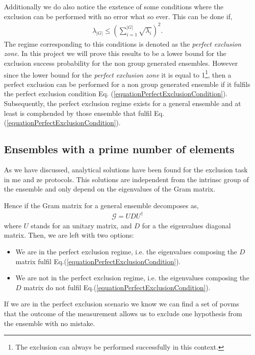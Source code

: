 \documentclass[12pt,letterpaper]{article}
\begin{document}
\begin{multicols}{2}
Additionally we do also notice the exstence of some conditions where the exclusion can be performed with no error what so ever. This can be done if,
\begin{align}\label{equationPerfectExclusionCondition}
	\lambda_{|G|}\leq \left(\sum_{i=1}^{|G|}\sqrt{\lambda_i}\right)^2.
\end{align}
The regime corresponding to this conditions is denoted as the \emph{perfect exclusion zone}. In this project we will prove this results to be a lower bound for the exclusion success probability for the non group generated ensembles. However since the lower bound for the \emph{perfect exclusion zone} it is equal to 1\footnote{The exclusion can always be performed successfully in this context.}, then a perfect exclusion can be performed for a non group generated ensemble if it fulfils the perfect exclusion condition Eq. (\ref{equationPerfectExclusionCondition}). Subsequently, the perfect exclusion regime exists for a general ensemble and at least is comphended by those ensemble that fulfil Eq. (\ref{equationPerfectExclusionCondition}).

\subsection{Ensembles with a prime number of elements}

As we have discussed, analytical solutions have been found for the exclusion task in \gls{me} and \gls{ze} protocols. This solutions are independent from the intrinsc group of the ensemble and only depend on the eigenvalues of the Gram matrix. 

Hence if the Gram matrix for a general ensemble decomposes as,
\begin{align}
	\mathcal{G}= UDU^\dagger
\end{align}
where $U$ stands for an unitary matrix, and $D$ for a the eigenvalues diagonal matrix. Then, we are left with two options:
\begin{itemize}
	\item We are in the perfect exclusion regime, i.e. the eigenvalues composing the $D$ matrix fulfil Eq.(\ref{equationPerfectExclusionCondition}).
	\item We are not in the perfect exclusion regime, i.e. the eigenvalues composing the $D$ matrix do not fulfil Eq.(\ref{equationPerfectExclusionCondition}).
\end{itemize}
If we are in the perfect exclusion scenario we know we can find a set of \gls{povm}s that the outcome of the measurement allows us to exclude one hypothesis from the ensemble with no mistake.


\end{multicols}
\end{document}
